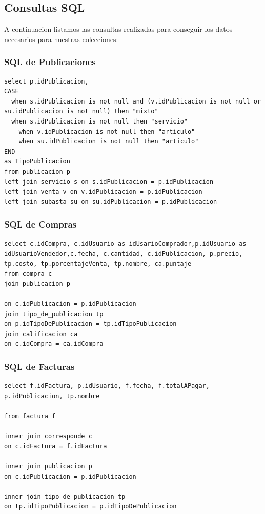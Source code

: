 \documentclass[a4paper, 10pt, twoside]{article}
\begin{document}
\newpage
\subsection{Consultas SQL}

A continuacion listamos las consultas realizadas para conseguir los datos necesarios para nuestras colecciones:
\subsubsection{SQL de Publicaciones}


\begin{verbatim}
select p.idPublicacion,   
CASE
  when s.idPublicacion is not null and (v.idPublicacion is not null or su.idPublicacion is not null) then "mixto"
  when s.idPublicacion is not null then "servicio"
    when v.idPublicacion is not null then "articulo"
    when su.idPublicacion is not null then "articulo"
END
as TipoPublicacion
from publicacion p
left join servicio s on s.idPublicacion = p.idPublicacion
left join venta v on v.idPublicacion = p.idPublicacion
left join subasta su on su.idPublicacion = p.idPublicacion
\end{verbatim}


\subsubsection{SQL de Compras}

\begin{verbatim}
select c.idCompra, c.idUsuario as idUsarioComprador,p.idUsuario as idUsuarioVendedor,c.fecha, c.cantidad, c.idPublicacion, p.precio, tp.costo, tp.porcentajeVenta, tp.nombre, ca.puntaje
from compra c 
join publicacion p
 
on c.idPublicacion = p.idPublicacion
join tipo_de_publicacion tp
on p.idTipoDePublicacion = tp.idTipoPublicacion
join calificacion ca 
on c.idCompra = ca.idCompra

\end{verbatim}

\subsubsection{SQL de Facturas}
\begin{verbatim}
select f.idFactura, p.idUsuario, f.fecha, f.totalAPagar, p.idPublicacion, tp.nombre

from factura f

inner join corresponde c
on c.idFactura = f.idFactura

inner join publicacion p
on c.idPublicacion = p.idPublicacion

inner join tipo_de_publicacion tp
on tp.idTipoPublicacion = p.idTipoDePublicacion

\end{verbatim}
\newpage
\end{document}
